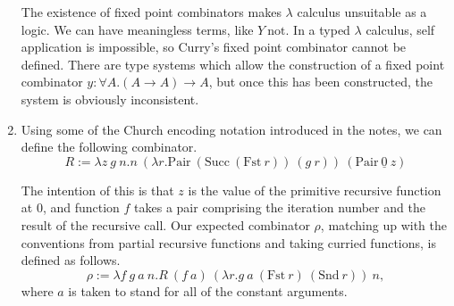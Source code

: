 \documentclass{article}
\begin{document}
\begin{enumerate}
    The existence of fixed point combinators makes $\lambda$ calculus unsuitable as a logic. We can have meaningless terms, like $Y~\mathrm{not}$. In a typed $\lambda$ calculus, self application is impossible, so Curry's fixed point combinator cannot be defined. There are type systems which allow the construction of a fixed point combinator $y : \forall A.(A \to A) \to A$, but once this has been constructed, the system is obviously inconsistent.
  \item
    Using some of the Church encoding notation introduced in the notes, we can define the following combinator.
    \[R := \lambda z~g~n.n~(\lambda r.\mathrm{Pair}~(\mathrm{Succ}~(\mathrm{Fst}~r))~(g~r))~(\mathrm{Pair}~\underline 0~z)\]

    The intention of this is that $z$ is the value of the primitive recursive function at $0$, and function $f$ takes a pair comprising the iteration number and the result of the recursive call. Our expected combinator $\rho$, matching up with the conventions from partial recursive functions and taking curried functions, is defined as follows.
    \[\rho := \lambda f~g~a~n.R~(f~a)~(\lambda r.g~a~(\mathrm{Fst}~r)~(\mathrm{Snd}~r))~n,\]
    where $a$ is taken to stand for all of the constant arguments.
\end{enumerate}
\end{document}
